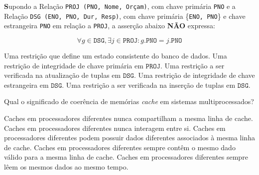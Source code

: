 \documentclass[12pt, addpoints]{exam}
\begin{document}
\begin{questions}
\question
\textbf Supondo a Relação \texttt{PROJ (PNO, Nome, Orçam)}, com chave primária \texttt{PNO} e a Relação \texttt{DSG (ENO, PNO, Dur, Resp)}, com chave primária \{\texttt{ENO, PNO}\} e chave estrangeira \texttt{PNO} em relação a \texttt{PROJ}, a asserção abaixo \textbf{NÃO} expressa:

\begin{equation}\forall g \in \texttt{DSG}, \exists j \in \texttt{PROJ} : g.\texttt{PNO} = j.\texttt{PNO}\end{equation}
\begin{choices}
\choice Uma restrição que define um estado consistente do banco de dados.
\choice Uma restrição de integridade de chave primária em $\texttt{PROJ}$.
\choice Uma restrição a ser verificada na atualização de tuplas em $\texttt{DSG}$.
\choice Uma restrição de integridade de chave estrangeira em $\texttt{DSG}$.
\choice Uma restrição a ser verificada na inserção de tuplas em $\texttt{DSG}$.
\end{choices}

\question
Qual o significado de coerência de memórias \textit{cache} em sistemas multiprocessados?

\begin{choices}
\choice Caches em processadores diferentes nunca compartilham a mesma linha de cache.
\choice Caches em processadores diferentes nunca interagem entre si.
\choice Caches em processadores diferentes podem possuir dados diferentes associados à mesma linha de cache.
\choice Caches em processadores diferentes sempre contêm o mesmo dado válido para a mesma linha de cache.
\choice Caches em processadores diferentes sempre lêem os mesmos dados ao mesmo tempo.
\end{choices}



    \end{questions}
    
\end{document}
